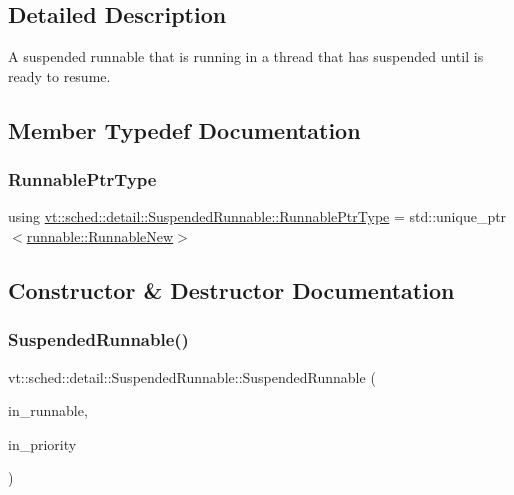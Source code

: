 \subsection{Detailed Description}
A suspended runnable that is running in a thread that has suspended until is ready to resume. 



\subsection{Member Typedef Documentation}
\mbox{\label{structvt_1_1sched_1_1detail_1_1_suspended_runnable_a36c09816947c24b12e308afd53d26d1c}} 
\subsubsection{\texorpdfstring{Runnable\+Ptr\+Type}{RunnablePtrType}}
{\footnotesize\ttfamily using \hyperlink{structvt_1_1sched_1_1detail_1_1_suspended_runnable_a36c09816947c24b12e308afd53d26d1c}{vt\+::sched\+::detail\+::\+Suspended\+Runnable\+::\+Runnable\+Ptr\+Type} =  std\+::unique\+\_\+ptr$<$\hyperlink{structvt_1_1runnable_1_1_runnable_new}{runnable\+::\+Runnable\+New}$>$}



\subsection{Constructor \& Destructor Documentation}
\mbox{\label{structvt_1_1sched_1_1detail_1_1_suspended_runnable_a2bc6c62d0934ab1f58f1367d62c0e4ef}} 
\subsubsection{\texorpdfstring{Suspended\+Runnable()}{SuspendedRunnable()}}
{\footnotesize\ttfamily vt\+::sched\+::detail\+::\+Suspended\+Runnable\+::\+Suspended\+Runnable (\begin{DoxyParamCaption}\item[{\hyperlink{structvt_1_1sched_1_1detail_1_1_suspended_runnable_a36c09816947c24b12e308afd53d26d1c}{Runnable\+Ptr\+Type}}]{in\+\_\+runnable,  }\item[{\hyperlink{namespacevt_a86bff9f556eb761b27fc8600d006ac04}{Priority\+Type}}]{in\+\_\+priority }\end{DoxyParamCaption})\hspace{0.3cm}{\ttfamily [inline]}}



